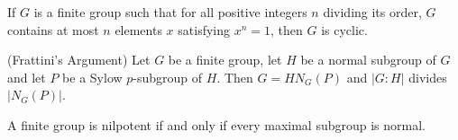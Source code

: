 \documentclass[../main]{subfiles}
\begin{document}
\begin{prop}
 If $G$ is a finite group such that for all positive integers $n$ dividing its order, $G$ contains at most $n$ elements $x$ satisfying $x^n = 1$, then $G$ is cyclic.
\end{prop}


\begin{prop}
 (Frattini's Argument) Let $G$ be a finite group, let $H$ be a normal subgroup of $G$ and let $P$ be a Sylow $p$-subgroup of $H$. Then $G = H N_G(P)$ and $|G : H|$ divides $|N_G(P)|$.
\end{prop}


\begin{prop}
 A finite group is nilpotent if and only if every maximal subgroup is normal. 
\end{prop}


















 
\end{document}
